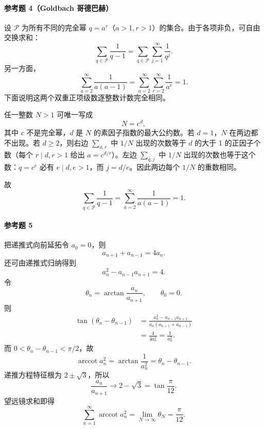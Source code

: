 \paragraph{参考题 4（Goldbach 哥德巴赫）}
\begin{xsolution}
设 $\mathcal P$ 为所有不同的完全幂 $q=a^r$（$a>1,r>1$）的集合。由于各项非负，可自由交换求和：
\[
  \sum_{q\in\mathcal P}\frac1{q-1}
  =\sum_{q\in\mathcal P}\sum_{j=1}^{\infty}\frac1{q^j}.
\]
另一方面，
\[
  \sum_{a=2}^{\infty}\frac1{a(a-1)}
  =\sum_{a=2}^{\infty}\sum_{r=2}^{\infty}\frac1{a^r}=1.
\]
下面说明这两个双重正项级数逐整数计数完全相同。

任一整数 $N>1$ 可唯一写成
\[
  N=c^d,
\]
其中 $c$ 不是完全幂，$d$ 是 $N$ 的素因子指数的最大公约数。若 $d=1$，$N$ 在两边都不出现。若 $d\geqslant2$，则右边 $\sum_{a,r}$ 中 $1/N$ 出现的次数等于 $d$ 的大于 1 的正因子个数（每个 $r\mid d,r>1$ 给出 $a=c^{d/r}$）。左边 $\sum_{q,j}$ 中 $1/N$ 出现的次数也等于这个数：$q=c^e$ 必有 $e\mid d,e>1$，而 $j=d/e$。因此两边每个 $1/N$ 的重数相同。

故
\[
  \sum_{q\in\mathcal P}\frac1{q-1}
  =\sum_{a=2}^{\infty}\frac1{a(a-1)}=1.
\]
\end{xsolution}

\paragraph{参考题 5}
\begin{xsolution}
把递推式向前延拓令 $a_0=0$，则
\[
  a_{n+1}+a_{n-1}=4a_n.
\]
还可由递推式归纳得到
\[
  a_n^2-a_{n-1}a_{n+1}=4.
\]
令
\[
  \theta_n=\arctan\frac{a_n}{a_{n+1}},\qquad \theta_0=0.
\]
则
\[
\begin{aligned}
  \tan(\theta_n-\theta_{n-1})
  &=\frac{a_n^2-a_{n-1}a_{n+1}}
  {a_n(a_{n+1}+a_{n-1})}\\
  &=\frac4{4a_n^2}=\frac1{a_n^2}.
\end{aligned}
\]
而 $0<\theta_n-\theta_{n-1}<\pi/2$，故
\[
  \operatorname{arccot}a_n^2
  =\arctan\frac1{a_n^2}=\theta_n-\theta_{n-1}.
\]
递推方程特征根为 $2\pm\sqrt3$，所以
\[
  \frac{a_n}{a_{n+1}}\to2-\sqrt3=\tan\frac\pi{12}.
\]
望远镜求和即得
\[
  \sum_{n=1}^{\infty}\operatorname{arccot}a_n^2
  =\lim_{N\to\infty}\theta_N=\frac\pi{12}.
\]
\end{xsolution}

